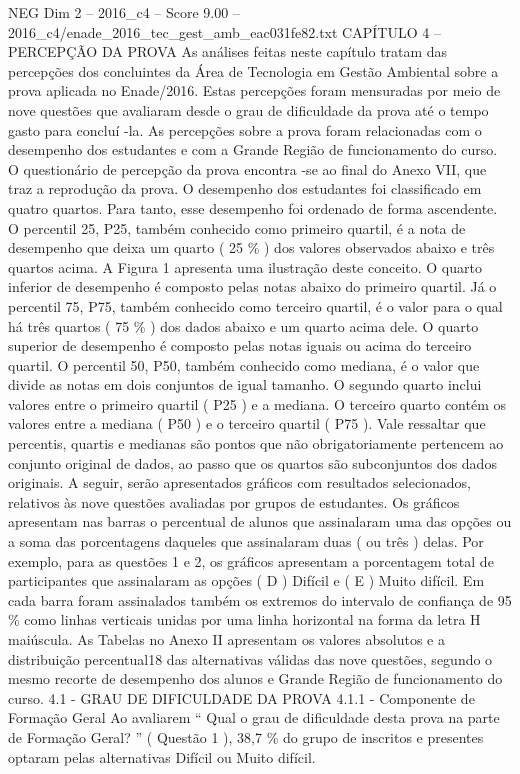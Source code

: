 \begin{textsample}{NEG Dim 2 – 2016\_c4 – Score 9.00 – 2016\_c4/enade\_2016\_tec\_gest\_amb\_eac031fe82.txt}  \label{ex:f2_neg_356}
CAPÍTULO 4 – PERCEPÇÃO DA PROVA As análises feitas neste capítulo tratam das percepções dos concluintes da Área de Tecnologia em Gestão Ambiental sobre a prova aplicada no Enade/2016.
Estas percepções foram mensuradas por meio de nove questões que avaliaram desde o grau de dificuldade da prova até o tempo gasto para concluí -la.
As percepções sobre a prova foram relacionadas com o desempenho dos estudantes e com a Grande Região de funcionamento do curso.
O questionário de percepção da prova encontra -se ao final do Anexo VII, que traz a reprodução da prova.
O desempenho dos estudantes foi classificado em quatro quartos.
Para tanto, esse desempenho foi ordenado de forma ascendente.
O percentil 25, P25, também conhecido como primeiro quartil, é a nota de desempenho que deixa um quarto ( 25 \% ) dos valores observados abaixo e três quartos acima.
A Figura 1 apresenta uma ilustração deste conceito.
O quarto inferior de desempenho é composto pelas notas abaixo do primeiro quartil.
Já o percentil 75, P75, também conhecido como terceiro quartil, é o valor para o qual há três quartos ( 75 \% ) dos dados abaixo e um quarto acima dele.
O quarto superior de desempenho é composto pelas notas iguais ou acima do terceiro quartil.
O percentil 50, P50, também conhecido como mediana, é o valor que divide as notas em dois conjuntos de igual tamanho.
O segundo quarto inclui valores entre o primeiro quartil ( P25 ) e a mediana.
O terceiro quarto contém os valores entre a mediana ( P50 ) e o terceiro quartil ( P75 ).
Vale ressaltar que percentis, quartis e medianas são pontos que não obrigatoriamente pertencem ao conjunto original de dados, ao passo que os quartos são subconjuntos dos dados originais.
A seguir, serão apresentados gráficos com resultados selecionados, relativos às nove questões avaliadas por grupos de estudantes.
Os gráficos apresentam nas barras o percentual de alunos que assinalaram uma das opções ou a soma das porcentagens daqueles que assinalaram duas ( ou três ) delas.
Por exemplo, para as questões 1 e 2, os gráficos apresentam a porcentagem total de participantes que assinalaram as opções ( D ) Difícil e ( E ) Muito difícil.
Em cada barra foram assinalados também os extremos do intervalo de confiança de 95 \% como linhas verticais unidas por uma linha horizontal na forma da letra H maiúscula.
As Tabelas no Anexo II apresentam os valores absolutos e a distribuição percentual18 das alternativas válidas das nove questões, segundo o mesmo recorte de desempenho dos alunos e Grande Região de funcionamento do curso. 4.1 - GRAU DE DIFICULDADE DA PROVA 4.1.1 - Componente de Formação Geral Ao avaliarem “ Qual o grau de dificuldade desta prova na parte de Formação Geral? ” ( Questão 1 ), 38,7 \% do grupo de inscritos e presentes optaram pelas alternativas Difícil ou Muito difícil.

\end{textsample}
